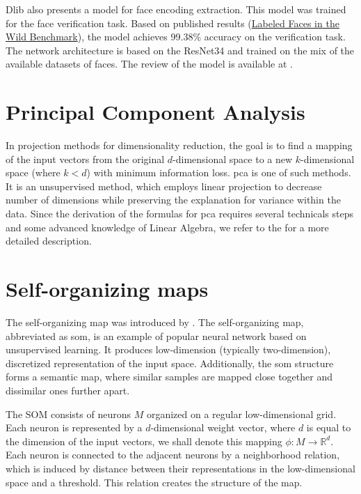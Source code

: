Dlib also presents a model for face encoding extraction. This model was trained for the face verification task. Based on published results (\href{http://vis-www.cs.umass.edu/lfw/results.html}{Labeled Faces in the Wild Benchmark}), the model achieves  99.38\% accuracy on the verification task. The network architecture is based on the ResNet34 and trained on the mix of the available datasets of faces. The review of the model is available at \citep{king2017high}.

\section{Principal Component Analysis}
\label{s:pca}

In projection methods for dimensionality reduction, the goal is to find a mapping of the input vectors from the original $d$-dimensional space to a new $k$-dimensional space (where $k < d$) with minimum information loss. \acrshort{pca} is one of such methods. It is an unsupervised method, which employs linear projection to decrease number of dimensions while preserving the explanation for variance within the data. Since the derivation of the formulas for \acrshort{pca} requires several technicals steps and some advanced knowledge of Linear Algebra, we refer to the \cite{alpaydin2020introduction} for a more detailed description.

\section{Self-organizing maps}
\label{s:som}

The self-organizing map was introduced by \cite{kohonen1982self}. The self-organizing map, abbreviated as \acrshort{som}, is an example of popular neural network based on unsupervised learning.  It produces low-dimension (typically two-dimension), discretized representation of the input space. Additionally, the \acrlong{som} structure forms a semantic map, where similar samples are mapped close together and dissimilar ones further apart.

The SOM consists of neurons $M$ organized on a regular low-dimensional grid. Each neuron is represented by a $d$-dimensional weight vector, where $d$ is equal to the dimension of the input vectors, we shall denote this mapping $\phi: M \rightarrow \mathbb{R}^d$. Each neuron is connected to the adjacent neurons by a neighborhood relation, which is induced by distance between their representations in the low-dimensional space and a threshold. This relation creates the structure of the map. 


